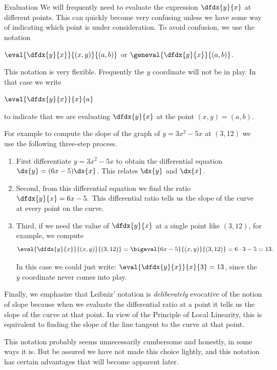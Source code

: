 \begin{mynotation}{Evaluation}
  We will frequently need to evaluate the expression $\dfdx{y}{x}$ at
  different points. This can  quickly become  very confusing
  unless we have some way of indicating which point is under
  consideration. To avoid  confusion, we  use the notation \\
\centerline{
$\eval{\dfdx{y}{x}}{(x,y)}{(a,b)}$ or $\geneval{\dfdx{y}{x}}{(a,b)}$.
}
This notation is very flexible. Frequently the $y$ coordinate will not
be in play. In that case we write \\
\centerline{$\eval{\dfdx{y}{x}}{x}{a}$}  
  to indicate that we are evaluating $\dfdx{y}{x}$ at the
  point $(x,y)=(a,b)$.
\end{mynotation}
\begin{myexample}
    For example to compute the slope of the graph of $y=3x^2-5x$ at
    $(3,12)$ we use the following three-step process.
    \begin{enumerate}
    \item First  differentiate $y=3x^2-5x$ to obtain the
      differential equation $\dx{y}=(6x-5)\dx{x}$. This 
      relates $\dx{y}$ and $\dx{x}$.
    \item Second, from this differential equation we 
      find the ratio  $\dfdx{y}{x}=6x-5.$ This
      differential ratio tells us the slope of the curve at
      every point on the curve.
    \item Third, if we need the value of $\dfdx{y}{x}$ at a single
      point like $(3,12)$, for example, we compute
      $$\eval{\dfdx{y}{x}}{(x,y)}{(3,12)}=\bigeval{6
        x-5}{(x,y)}{(3,12)}=6\cdot3-5=13.$$

   In this case we
      could just write: $\eval{\dfdx{y}{x}}{x}{3}=13$, since the $y$
      coordinate never comes into play.
    \end{enumerate}
    Finally, we emphasize that Leibniz' notation is
    \emph{deliberately} evocative of the notion of slope because when
    we evaluate the differential ratio at a point it tells us the
    slope of the curve at that point.  In view of the \alert{Principle
      of Local Linearity}, this is equivalent to finding the slope of
    the line tangent to the curve at that point.
  \end{myexample}

  This notation probably seems unnecessarily cumbersome and honestly, in
  some ways it is. But be assured we have not made this choice
  lightly, and this notation has certain advantages that will become
  apparent later.

